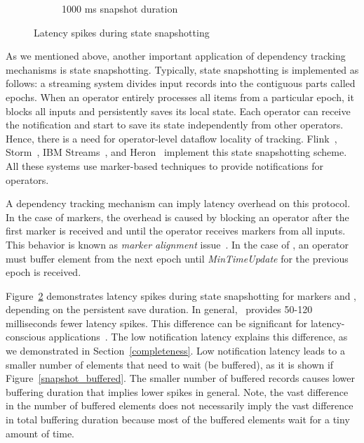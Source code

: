 \begin{figure}[t!]
\begin{subfigure}[b]{0.32\textwidth}
            \caption{1000 ms snapshot duration}
            \label{1000ms_snapshot}
    \end{subfigure}
    \caption{Latency spikes during state snapshotting}
    \label{snapshot_spikes}
\end{figure}

As we mentioned above, another important application of dependency tracking mechanisms is state snapshotting. Typically, state snapshotting is implemented as follows: a streaming system divides input records into the contiguous parts called epochs. When an operator entirely processes all items from a particular epoch, it blocks all inputs and persistently saves its local state. Each operator can receive the notification and start to save its state independently from other operators. Hence, there is a need for operator-level dataflow locality of tracking. Flink~\cite{Carbone:2017:SMA:3137765.3137777}, Storm~\cite{apache:storm:state}, IBM Streams~\cite{jacques2016consistent}, and Heron~\cite{Kulkarni:2015:THS:2723372.2742788} implement this state snapshotting scheme. All these systems use marker-based techniques to provide notifications for operators.

A dependency tracking mechanism can imply latency overhead on this protocol. In the case of markers, the overhead is caused by blocking an operator after the first marker is received and until the operator receives markers from all inputs. This behavior is known as {\em marker alignment} issue~\cite{Carbone:2017:SMA:3137765.3137777}. In the case of \tracker , an operator must buffer element from the next epoch until {\em MinTimeUpdate} for the previous epoch is received.


Figure~\ref{snapshot_spikes} demonstrates latency spikes during state snapshotting for markers and \tracker , depending on the persistent save duration. In general, \tracker\ provides 50-120 milliseconds fewer latency spikes. This difference can be significant for latency-conscious applications~\cite{zhang2017sub}. The low notification latency explains this difference, as we demonstrated in Section~\ref{completeness}. Low notification latency leads to a smaller number of elements that need to wait (be buffered), as it is shown if Figure~\ref{snapshot_buffered}. The smaller number of buffered records causes lower buffering duration that implies lower spikes in general. Note, the vast difference in the number of buffered elements does not necessarily imply the vast difference in total buffering duration because most of the buffered elements wait for a tiny amount of time.

